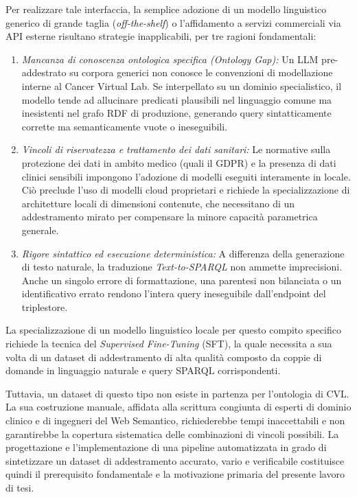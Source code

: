 \documentclass[12pt,a4paper,openright,twoside]{book}
\begin{document}
Per realizzare tale interfaccia, la semplice adozione di un modello linguistico
generico di grande taglia (\textit{off-the-shelf}) o l'affidamento a servizi
commerciali via API esterne risultano strategie inapplicabili, per tre ragioni
fondamentali:
\begin{enumerate}
    \item \textit{Mancanza di conoscenza ontologica specifica (\textit{Ontology
                  Gap}):} Un LLM pre-addestrato su corpora generici non conosce
          le convenzioni di modellazione interne al Cancer Virtual Lab.
          Se interpellato su un dominio specialistico, il modello tende
          ad allucinare predicati plausibili nel linguaggio comune ma
          inesistenti nel grafo RDF di produzione, generando query
          sintatticamente corrette ma semanticamente vuote o
          ineseguibili.

    \item \textit{Vincoli di riservatezza e trattamento dei dati sanitari:} Le
          normative sulla protezione dei dati in ambito medico (quali il GDPR) e
          la presenza di dati clinici sensibili impongono l'adozione di modelli
          eseguiti interamente in locale. Ciò preclude l'uso di modelli cloud
          proprietari e richiede la specializzazione di architetture locali di
          dimensioni contenute, che necessitano di un addestramento mirato per
          compensare la minore capacità parametrica generale.

    \item \textit{Rigore sintattico ed esecuzione deterministica:} A differenza
          della generazione di testo naturale, la traduzione
          \textit{Text-to-SPARQL} non ammette imprecisioni. Anche un singolo
          errore di formattazione, una parentesi non bilanciata o un
          identificativo errato rendono l'intera query ineseguibile
          dall'endpoint del triplestore.
\end{enumerate}

La specializzazione di un modello linguistico locale per questo compito
specifico richiede la tecnica del \textit{Supervised Fine-Tuning} (SFT), la
quale necessita a sua volta di un dataset di addestramento di alta qualità
composto da coppie di domande in linguaggio naturale e query SPARQL
corrispondenti.

Tuttavia, un dataset di questo tipo non esiste in partenza per l'ontologia di
CVL. La sua costruzione manuale, affidata alla scrittura congiunta di esperti di
dominio clinico e di ingegneri del Web Semantico, richiederebbe tempi
inaccettabili e non garantirebbe la copertura sistematica delle combinazioni di
vincoli possibili. La progettazione e l'implementazione di una pipeline
automatizzata in grado di sintetizzare un dataset di addestramento accurato,
vario e verificabile costituisce quindi il prerequisito fondamentale e la
motivazione primaria del presente lavoro di tesi.
\end{document}
